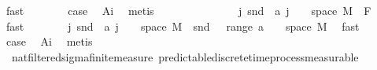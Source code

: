 \begin{isabellebody}
\ fast\isanewline
\ \ \ \ \isamarkupfalse%
\ \isamarkupfalse%
\ {\isacharquery}{\kern0pt}case\ \isamarkupfalse%
\ A{\isacharunderscore}{\kern0pt}i\ \isamarkupfalse%
\ metis\isanewline
\ \ \isamarkupfalse%
\isanewline
\ \ \ \ \isamarkupfalse%
\ {}\isanewline
\ \ \ \ \isamarkupfalse%
\ {\isachardoublequoteopen}{\isacharparenleft}{\kern0pt}{\isasymUnion}j{\isachardot}{\kern0pt}\ snd\ {\isacharbackquote}{\kern0pt}\ {\isacharparenleft}{\kern0pt}a\ j\ {\isasyminter}\ {\isacharparenleft}{\kern0pt}{\isacharbraceleft}{\kern0pt}{}{\isacharbraceright}{\kern0pt}\ {\isasymtimes}\ space\ M{\isacharparenright}{\kern0pt}{\isacharparenright}{\kern0pt}{\isacharparenright}{\kern0pt}\ {\isasymin}\ F\ {}{\isachardoublequoteclose}\ \isamarkupfalse%
\ {\isacharasterisk}{\kern0pt}\ \isamarkupfalse%
\ fast\isanewline
\ \ \ \ \isamarkupfalse%
\ \isamarkupfalse%
\ {\isachardoublequoteopen}{\isacharparenleft}{\kern0pt}{\isasymUnion}j{\isachardot}{\kern0pt}\ snd\ {\isacharbackquote}{\kern0pt}\ {\isacharparenleft}{\kern0pt}a\ j\ {\isasyminter}\ {\isacharparenleft}{\kern0pt}{\isacharbraceleft}{\kern0pt}{}{\isacharbraceright}{\kern0pt}\ {\isasymtimes}\ space\ M{\isacharparenright}{\kern0pt}{\isacharparenright}{\kern0pt}{\isacharparenright}{\kern0pt}\ {\isacharequal}{\kern0pt}\ snd\ {\isacharbackquote}{\kern0pt}\ {\isacharparenleft}{\kern0pt}{\isasymUnion}\ {\isacharparenleft}{\kern0pt}range\ a{\isacharparenright}{\kern0pt}\ {\isasyminter}\ {\isacharparenleft}{\kern0pt}{\isacharbraceleft}{\kern0pt}{}{\isacharbraceright}{\kern0pt}\ {\isasymtimes}\ space\ M{\isacharparenright}{\kern0pt}{\isacharparenright}{\kern0pt}{\isachardoublequoteclose}\ \isamarkupfalse%
\ fast\isanewline
\ \ \ \ \isamarkupfalse%
\ \isamarkupfalse%
\ {\isacharquery}{\kern0pt}case\ \isamarkupfalse%
\ A{\isacharunderscore}{\kern0pt}i\ \isamarkupfalse%
\ metis\isanewline
\ \ \isacommand{{\isacharbraceright}{\kern0pt}}\isamarkupfalse%
\isanewline
{}\isamarkupfalse%
%
\endisatagproof
{\isafoldproof}%
%
\isadelimproof
\isanewline
%
\endisadelimproof
\isanewline
{}\isamarkupfalse%
\ {\isacharparenleft}{\kern0pt}\ nat{\isacharunderscore}{\kern0pt}filtered{\isacharunderscore}{\kern0pt}sigma{\isacharunderscore}{\kern0pt}finite{\isacharunderscore}{\kern0pt}measure{\isacharparenright}{\kern0pt}\ predictable{\isacharunderscore}{\kern0pt}discrete{\isacharunderscore}{\kern0pt}time{\isacharunderscore}{\kern0pt}process{\isacharunderscore}{\kern0pt}measurable{\isacharcolon}{\kern0pt}\isanewline

\end{isabellebody}
